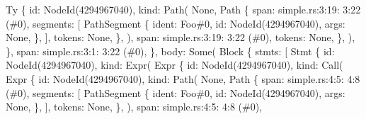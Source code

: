 \documentclass[
  11pt,
  twoside]{report}
\newenvironment{Shaded}{}{}
\newcommand{\NormalTok}[1]{#1}
\begin{document}
\begin{Shaded}
\begin{Highlighting}[]
\NormalTok{                Ty \{}
\NormalTok{                    id: NodeId(4294967040),}
\NormalTok{                    kind: Path(}
\NormalTok{                        None,}
\NormalTok{                        Path \{}
\NormalTok{                            span: simple.rs:3:19: 3:22 (\#0),}
\NormalTok{                            segments: [}
\NormalTok{                                PathSegment \{}
\NormalTok{                                    ident: Foo\#0,}
\NormalTok{                                    id: NodeId(4294967040),}
\NormalTok{                                    args: None,}
\NormalTok{                                \},}
\NormalTok{                            ],}
\NormalTok{                            tokens: None,}
\NormalTok{                        \},}
\NormalTok{                    ),}
\NormalTok{                    span: simple.rs:3:19: 3:22 (\#0),}
\NormalTok{                    tokens: None,}
\NormalTok{                \},}
\NormalTok{            ),}
\NormalTok{        \},}
\NormalTok{        span: simple.rs:3:1: 3:22 (\#0),}
\NormalTok{    \},}
\NormalTok{    body: Some(}
\NormalTok{        Block \{}
\NormalTok{            stmts: [}
\NormalTok{                Stmt \{}
\NormalTok{                    id: NodeId(4294967040),}
\NormalTok{                    kind: Expr(}
\NormalTok{                        Expr \{}
\NormalTok{                            id: NodeId(4294967040),}
\NormalTok{                            kind: Call(}
\NormalTok{                                Expr \{}
\NormalTok{                                    id: NodeId(4294967040),}
\NormalTok{                                    kind: Path(}
\NormalTok{                                        None,}
\NormalTok{                                        Path \{}
\NormalTok{                                            span: simple.rs:4:5: 4:8 (\#0),}
\NormalTok{                                            segments: [}
\NormalTok{                                                PathSegment \{}
\NormalTok{                                                    ident: Foo\#0,}
\NormalTok{                                                    id: NodeId(4294967040),}
\NormalTok{                                                    args: None,}
\NormalTok{                                                \},}
\NormalTok{                                            ],}
\NormalTok{                                            tokens: None,}
\NormalTok{                                        \},}
\NormalTok{                                    ),}
\NormalTok{                                    span: simple.rs:4:5: 4:8 (\#0),}

\end{Highlighting}
\end{Shaded}
\end{document}
